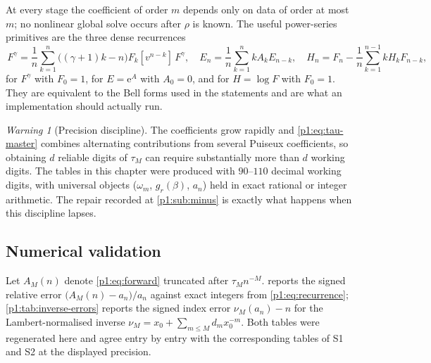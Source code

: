 \documentclass[11pt,a4paper,oneside]{book}
\theoremstyle{plain}
\theoremstyle{definition}
\theoremstyle{remark}
\newtheorem{warning}[theorem]{Warning}
\newcommand{\e}{\mathrm{e}}
\newcommand{\Coef}[1]{[#1]\,}
\begin{document}
At every stage the coefficient of order $m$ depends only on data of order at most $m$; no
nonlinear global solve occurs after $\rho$ is known.  The useful power-series primitives are
the three dense recurrences
\begin{equation}
 \Coef{v^{n}}F^{\gamma}=\frac1n\sum_{k=1}^{n}
 \bigl((\gamma+1)k-n\bigr)F_k\Coef{v^{n-k}}F^{\gamma},
 \quad
 E_n=\frac1n\sum_{k=1}^{n}kA_kE_{n-k},
 \quad
 H_n=F_n-\frac1n\sum_{k=1}^{n-1}kH_kF_{n-k},
 \label{p1:eq:dense-recurrences}
\end{equation}
for $F^{\gamma}$ with $F_0=1$, for $E=\e^{A}$ with $A_0=0$, and for $H=\log F$ with $F_0=1$.
They are equivalent to the Bell forms used in the statements and are what an implementation
should actually run.

\begin{warning}[Precision discipline]
\label{p1:rem:precision}
The coefficients grow rapidly and \cref{p1:eq:tau-master} combines alternating contributions
from several Puiseux coefficients, so obtaining $d$ reliable digits of $\tau_M$ can require
substantially more than $d$ working digits.  The tables in this chapter were produced with
$90$--$110$ decimal working digits, with universal objects ($\omega_m$, $g_r(\beta)$, $a_n$)
held in exact rational or integer arithmetic.  The repair recorded at \cref{p1:sub:minus} is
exactly what happens when this discipline lapses.
\end{warning}

\subsection{Numerical validation}
\label{p1:sub:numerics}

Let $A_M(n)$ denote \cref{p1:eq:forward} truncated after $\tau_M n^{-M}$.
 reports the signed relative error $\bigl(A_M(n)-a_n\bigr)/a_n$
against exact integers from \cref{p1:eq:recurrence}; \cref{p1:tab:inverse-errors} reports the
signed index error $\nu_M(a_n)-n$ for the Lambert-normalised inverse $\nu_M=x_0+\sum_{m\le
M}d_mx_0^{-m}$.  Both tables were regenerated here and agree entry by entry with the
corresponding tables of \textsf{S1} and \textsf{S2} at the displayed precision.
\end{document}
